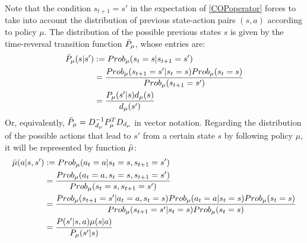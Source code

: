 \documentclass[12pt,a4paper,openright,twoside]{article}
\numberwithin{equation}{section}
\theoremstyle{definition}
\theoremstyle{remark}
\theoremstyle{plain}
\begin{document}
Note that the condition $s_{t+1} = s'$ in the expectation of \ref{COPoperator} forces to take into account the distribution of previous state-action pairs $(s,a)$ according to policy $\mu$. The distribution of the possible previous states $s$ is given by the time-reversal transition function $\Bar{P}_\mu$, whose entries are:
\begin{equation} \label{timeReversalTransitionFunction}
\begin{split}
    \Bar{P}_\mu (s | s') &:= Prob_\mu (s_t = s | s_{t+1} = s') \\
    &= \frac{Prob_\mu ( s_{t+1} = s' | s_t = s) Prob_\mu(s_t=s)}{Prob_\mu ( s_{t+1} = s')} \\
    &= \frac{P_\mu (s' | s) d_\mu(s)}{d_\mu(s')} 
\end{split}
\end{equation}
Or, equivalently, $ \Bar{P}_\mu = D_{d_\mu}^{-1}P_\mu^T D_{d_\mu}$ in vector notation. Regarding the distribution of the possible actions that lead to $s'$ from a certain state $s$ by following policy $\mu$, it will be represented by function $\Bar{\mu}$:  
\begin{equation}
\begin{split}
        \Bar{\mu}(a|s,s') &:= Prob_\mu(a_t=a | s_t = s, s_{t+1}=s') \\
        &= \frac{Prob_\mu (a_t=a, s_t = s, s_{t+1}=s')}{Prob_\mu (s_t = s, s_{t+1}=s')} \\
        &= \frac{Prob_\mu (s_{t+1}=s' | a_t=a, s_t = s) Prob_\mu (a_t=a | s_t = s) Prob_\mu (s_t = s)}{Prob_\mu (s_{t+1}=s' | s_t = s) Prob_\mu (s_t = s)} \\
        &= \frac{P(s'|s,a)\mu(s|a)}{P_\mu (s'|s)}
\end{split}
\end{equation}
\end{document}
